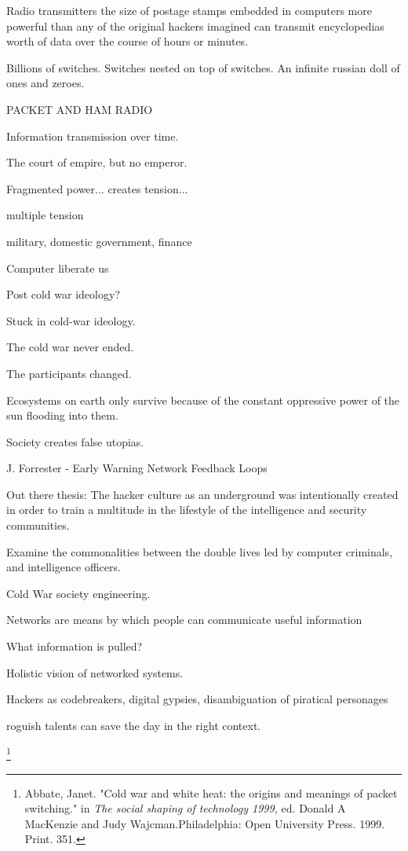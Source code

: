 \documentclass[11pt]{article}
\begin{document}
Radio transmitters the size of postage stamps embedded in computers more powerful than any of the original hackers imagined can transmit encyclopedias worth of data over the course of hours or minutes.

Billions of switches. Switches nested on top of switches. An infinite russian doll of ones and zeroes.

PACKET AND HAM RADIO

Information transmission over time.

The court of empire, but no emperor.

Fragmented power...  creates tension...

multiple tension

military, domestic government, finance

Computer liberate us

Post cold war ideology?

Stuck in cold-war ideology.

The cold war never ended.

The participants changed.

Ecosystems on earth only survive because of the constant oppressive power of the sun flooding into them.

Society creates false utopias.

J. Forrester - Early Warning Network
Feedback Loops

Out there thesis: The hacker culture as an underground was intentionally created in order to train a multitude in the lifestyle of the intelligence and security communities.

Examine the commonalities between the double lives led by computer criminals, and intelligence officers.

Cold War society engineering.

Networks are means by which people can communicate useful information

What information is pulled?

Holistic vision of networked systems.

Hackers as codebreakers,
digital gypsies,
disambiguation of piratical personages

roguish talents can save the day in the right context.

\footnote{Abbate, Janet. "Cold war and white heat: the origins and meanings of packet switching." in \emph{The social shaping of technology 1999,} ed. Donald A MacKenzie and Judy Wajcman.Philadelphia: Open University Press. 1999. Print. 351.}
\end{document}
